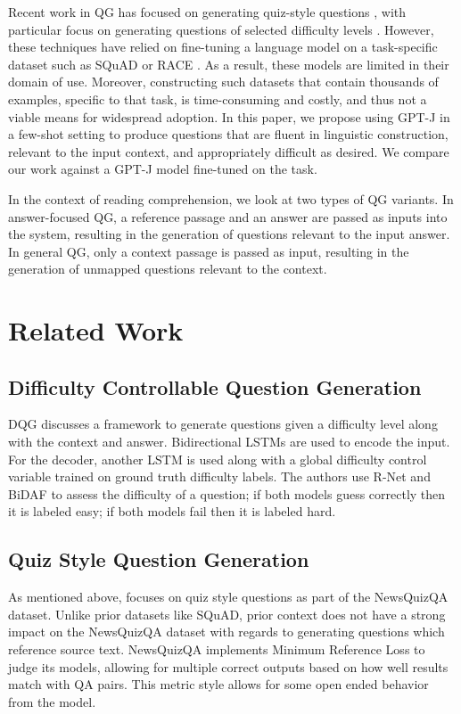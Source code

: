 \documentclass[11pt]{article}
\begin{document}
Recent work in QG has focused on generating quiz-style questions \citep{Quiz:1}, with particular focus on generating questions of selected difficulty levels \citep{Difficulty:3}. However, these techniques have relied on fine-tuning a language model on a task-specific dataset such as SQuAD \citep{squad:11} or RACE \citep{RACE:2}. As a result, these models are limited in their domain of use. Moreover, constructing such datasets that contain thousands of examples, specific to that task, is time-consuming and costly, and thus not a viable means for widespread adoption. In this paper, we propose using GPT-J in a few-shot setting to produce questions that are fluent in linguistic construction, relevant to the input context, and appropriately difficult as desired. We compare our work against a GPT-J model fine-tuned on the task.

In the context of reading comprehension, we look at two types of QG variants. In answer-focused QG, a reference passage and an answer are passed as inputs into the system, resulting in the generation of questions relevant to the input answer. In general QG, only a context passage is passed as input, resulting in the generation of unmapped questions relevant to the context.

\section{Related Work}

\subsection{Difficulty Controllable Question Generation}

DQG discusses a framework to generate questions given a difficulty level along with the context and answer. Bidirectional LSTMs are used to encode the input. For the decoder, another LSTM is used along with a global difficulty control variable trained on ground truth difficulty labels. The authors use R-Net and BiDAF to assess the difficulty of a question; if both models guess correctly then it is labeled easy; if both models fail then it is labeled hard. 

\subsection{Quiz Style Question Generation}
As mentioned above, \citet{Quiz:1} focuses on quiz style questions as part of the NewsQuizQA dataset. Unlike prior datasets like SQuAD, prior context does not have a strong impact on the NewsQuizQA dataset with regards to generating questions which reference source text. NewsQuizQA implements Minimum Reference Loss to judge its models, allowing for multiple correct outputs based on how well results match with QA pairs. This metric style allows for some open ended behavior from the model.
\end{document}
